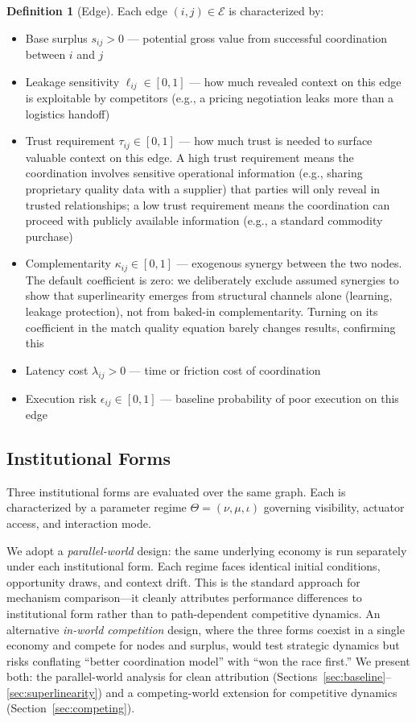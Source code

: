 \documentclass[12pt]{article}
\theoremstyle{definition}
\newtheorem{definition}{Definition}
\begin{document}
\begin{definition}[Edge]
Each edge $(i,j) \in \mathcal{E}$ is characterized by:
\begin{itemize}
\item Base surplus $s_{ij} > 0$ --- potential gross value from successful coordination between $i$ and $j$
\item Leakage sensitivity $\ell_{ij} \in [0,1]$ --- how much revealed context on this edge is exploitable by competitors (e.g., a pricing negotiation leaks more than a logistics handoff)
\item Trust requirement $\tau_{ij} \in [0,1]$ --- how much trust is needed to surface valuable context on this edge. A high trust requirement means the coordination involves sensitive operational information (e.g., sharing proprietary quality data with a supplier) that parties will only reveal in trusted relationships; a low trust requirement means the coordination can proceed with publicly available information (e.g., a standard commodity purchase)
\item Complementarity $\kappa_{ij} \in [0,1]$ --- exogenous synergy between the two nodes. The default coefficient is zero: we deliberately exclude assumed synergies to show that superlinearity emerges from structural channels alone (learning, leakage protection), not from baked-in complementarity. Turning on its coefficient in the match quality equation barely changes results, confirming this
\item Latency cost $\lambda_{ij} > 0$ --- time or friction cost of coordination
\item Execution risk $\epsilon_{ij} \in [0,1]$ --- baseline probability of poor execution on this edge
\end{itemize}
\end{definition}

\subsection{Institutional Forms}

Three institutional forms are evaluated over the same graph. Each is characterized by a parameter regime $\Theta = (\nu, \mu, \iota)$ governing visibility, actuator access, and interaction mode.

\begin{remark}
We adopt a \textit{parallel-world} design: the same underlying economy is run separately under each institutional form. Each regime faces identical initial conditions, opportunity draws, and context drift. This is the standard approach for mechanism comparison---it cleanly attributes performance differences to institutional form rather than to path-dependent competitive dynamics. An alternative \textit{in-world competition} design, where the three forms coexist in a single economy and compete for nodes and surplus, would test strategic dynamics but risks conflating ``better coordination model'' with ``won the race first.'' We present both: the parallel-world analysis for clean attribution (Sections~\ref{sec:baseline}--\ref{sec:superlinearity}) and a competing-world extension for competitive dynamics (Section~\ref{sec:competing}).
\end{remark}
\end{document}
